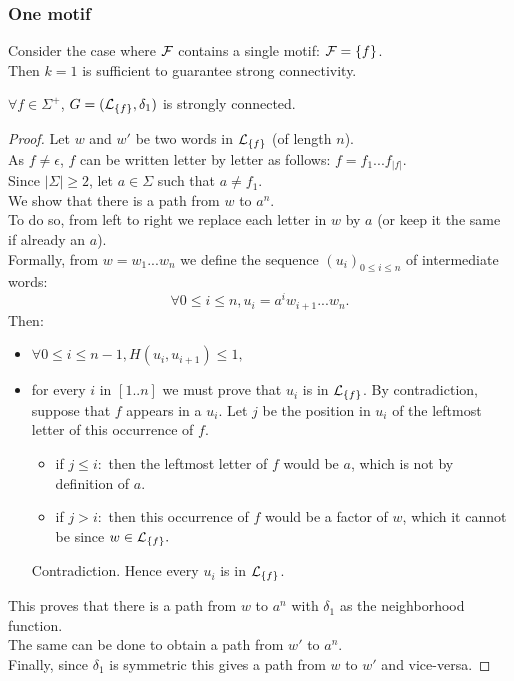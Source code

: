 \documentclass{article}
\begin{document}
\subsubsection{One motif}

Consider the case where $\mathcal{F}$ contains a single motif: $\mathcal{F} = \{f\}$. \\
Then $k = 1$ is sufficient to guarantee strong connectivity.
\begin{result}
	$\forall f \in \Sigma^+$, $G = (\mathcal{L}_{\{f\}}, \delta_1)$ is strongly connected.
\end{result}
\begin{proof}
	Let $w$ and $w'$ be two words in $\mathcal{L}_{\{f\}}$ (of length $n$). \\
	As $f \neq \epsilon$, $f$ can be written letter by letter as follows: $f = f_1 ... f_{|f|}$. \\
	Since $|\Sigma| \geq 2$, let $a \in \Sigma$ such that $a \neq f_1$. \\
	We show that there is a path from $w$ to $a^n$. \\
	To do so, from left to right we replace each letter in $w$ by $a$ (or keep it the same if already an $a$). \\
	Formally, from $w = w_1 ... w_n$ we define the sequence $(u_i)_{0 \leq i \leq n}$ of intermediate words:
	$$ \forall 0 \leq i \leq n, u_i = a^i w_{i+1} ... w_n.$$
	Then:
	\begin{itemize}
		\item $\forall 0 \leq i \leq n - 1, H(u_i, u_{i+1}) \leq 1,$
		\item for every $i$ in $[1..n]$ we must prove that $u_i$ is in $\mathcal{L}_{\{f\}}$. By contradiction, suppose that $f$ appears in a $u_i$. Let $j$ be the position in $u_i$ of the leftmost letter of this occurrence of $f$.
		\begin{itemize}
			\item if $j \leq i:$ then the leftmost letter of $f$ would be $a$, which is not by definition of $a$.
			\item if $j > i:$ then this occurrence of $f$ would be a factor of $w$, which it cannot be since $w \in \mathcal{L}_{\{f\}}.$
		\end{itemize}
	Contradiction. Hence every $u_i$ is in $\mathcal{L}_{\{f\}}$.
	\end{itemize}
	This proves that there is a path from $w$ to $a^n$ with $\delta_1$ as the neighborhood function. \\
	The same can be done to obtain a path from $w'$ to $a^n$. \\
	Finally, since $\delta_1$ is symmetric this gives a path from $w$ to $w'$ and vice-versa.	
\end{proof}
\end{document}
